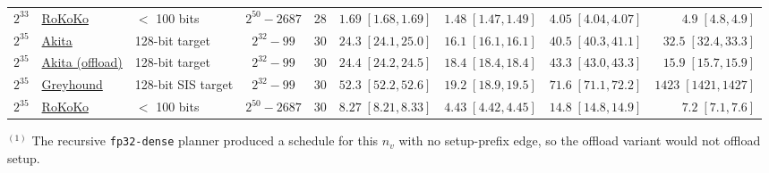 \begin{table}[H]
\begin{tabular}{@{}lllccrrrr@{}}
$2^{33}$ & \href{https://github.com/lattice-arguments/rokoko/commit/26d07c73c54872b9e8d2b3200117a6a0a21b10ee}{RoKoKo} & $<$ 100 bits & $2^{50}-2687$ & 28 & $1.69\;[1.68, 1.69]$ & $1.48\;[1.47, 1.49]$ & $4.05\;[4.04, 4.07]$ & $4.9\;[4.8, 4.9]$ \\
\addlinespace
$2^{35}$ & \href{https://github.com/LayerZero-Labs/akita/commit/c0cb822f28b7b9efe85b1924b029d36e13cdf516}{Akita} & 128-bit target & $2^{32}-99$ & 30 & $24.3\;[24.1, 25.0]$ & $16.1\;[16.1, 16.1]$ & $40.5\;[40.3, 41.1]$ & $32.5\;[32.4, 33.3]$ \\
$2^{35}$ & \href{https://github.com/LayerZero-Labs/akita/commit/c0cb822f28b7b9efe85b1924b029d36e13cdf516}{Akita (offload)} & 128-bit target & $2^{32}-99$ & 30 & $24.4\;[24.2, 24.5]$ & $18.4\;[18.4, 18.4]$ & $43.3\;[43.0, 43.3]$ & $15.9\;[15.7, 15.9]$ \\
$2^{35}$ & \href{https://github.com/LayerZero-Labs/greyhound-reference/commit/672e74100496f6ef698ba35e241cf7593e3d57af}{Greyhound} & 128-bit SIS target & $2^{32}-99$ & 30 & $52.3\;[52.2, 52.6]$ & $19.2\;[18.9, 19.5]$ & $71.6\;[71.1, 72.2]$ & $1423\;[1421, 1427]$ \\
$2^{35}$ & \href{https://github.com/lattice-arguments/rokoko/commit/26d07c73c54872b9e8d2b3200117a6a0a21b10ee}{RoKoKo} & $<$ 100 bits & $2^{50}-2687$ & 30 & $8.27\;[8.21, 8.33]$ & $4.43\;[4.42, 4.45]$ & $14.8\;[14.8, 14.9]$ & $7.2\;[7.1, 7.6]$ \\
\bottomrule
\end{tabular}
\smallskip
{\footnotesize
\noindent$^{(1)}$ The recursive \texttt{fp32-dense} planner produced a schedule for this $n_v$ with no setup-prefix edge, so the offload variant would not offload setup.\\
}
\end{table}


